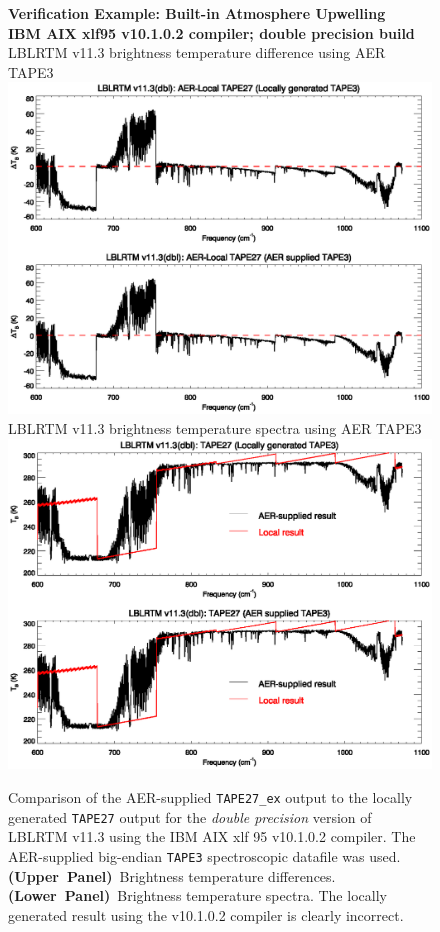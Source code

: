 \begin{figure}[htp]
  \centering
  \qquad\sffamily\textbf{Verification Example: Built-in Atmosphere Upwelling}\\
  \qquad\sffamily\textbf{IBM AIX xlf95 v10.1.0.2 compiler; double precision build}\\
  \qquad\textsf{LBLRTM v11.3 brightness temperature difference using AER TAPE3}\\
  \includegraphics[bb=80 403 534 558,clip,scale=1.0]{graphics/run_example_user_defined_upwelling/dbl-ibm_busted-dt.eps}
  \qquad\textsf{LBLRTM v11.3 brightness temperature spectra using AER TAPE3}\\
  \includegraphics[bb=80 403 534 558,clip,scale=1.0]{graphics/run_example_user_defined_upwelling/dbl-ibm_busted-t.eps}
  \caption{Comparison of the AER-supplied \texttt{TAPE27\_ex} output to the locally generated \texttt{TAPE27} output for the \textsl{double precision} version of LBLRTM v11.3 using the IBM AIX xlf 95 v10.1.0.2 compiler. The AER-supplied big-endian \texttt{TAPE3} spectroscopic datafile was used. \mbox{\textbf{(Upper Panel)} Brightness} temperature differences. \mbox{\textbf{(Lower Panel)} Brightness} temperature spectra. The locally generated result using the v10.1.0.2 compiler is clearly incorrect.}
  \label{fig:run_example_user_defined_atm_upwelling-dbl-ibm_busted}
\end{figure}


